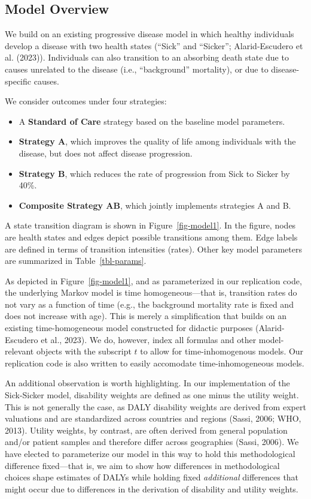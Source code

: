 \documentclass[
]{agujournal2019}
\providecommand{\tightlist}{%
  \setlength{\itemsep}{0pt}\setlength{\parskip}{0pt}}\usepackage{longtable,booktabs,array}
\begin{document}
\subsection{Model Overview}\label{sec-overview}

We build on an existing progressive disease model in which healthy
individuals develop a disease with two health states (``Sick'' and
``Sicker''; Alarid-Escudero et al. (2023)). Individuals can also
transition to an absorbing death state due to causes unrelated to the
disease (i.e., ``background'' mortality), or due to disease-specific
causes.

We consider outcomes under four strategies:

\begin{itemize}
\tightlist
\item
  A \textbf{Standard of Care} strategy based on the baseline model
  parameters.
\item
  \textbf{Strategy A}, which improves the quality of life among
  individuals with the disease, but does not affect disease progression.
\item
  \textbf{Strategy B}, which reduces the rate of progression from Sick
  to Sicker by 40\%.
\item
  \textbf{Composite Strategy AB}, which jointly implements strategies A
  and B.
\end{itemize}

A state transition diagram is shown in Figure~\ref{fig-model1}. In the
figure, nodes are health states and edges depict possible transitions
among them. Edge labels are defined in terms of transition intensities
(rates). Other key model parameters are summarized in
Table~\ref{tbl-params}.

As depicted in Figure~\ref{fig-model1}, and as parameterized in our
replication code, the underlying Markov model is time homogeneous---that
is, transition rates do not vary as a function of time (e.g., the
background mortality rate is fixed and does not increase with age). This
is merely a simplification that builds on an existing time-homogeneous
model constructed for didactic purposes (Alarid-Escudero et al., 2023).
We do, however, index all formulas and other model-relevant objects with
the subscript \(t\) to allow for time-inhomogenous models. Our
replication code is also written to easily accomodate time-inhomogeneous
models.

An additional observation is worth highlighting. In our implementation
of the Sick-Sicker model, disability weights are defined as one minus
the utility weight. This is not generally the case, as DALY disability
weights are derived from expert valuations and are standardized across
countries and regions (Sassi, 2006; WHO, 2013). Utility weights, by
contrast, are often derived from general population and/or patient
samples and therefore differ across geographies (Sassi, 2006). We have
elected to parameterize our model in this way to hold this
methodological difference fixed---that is, we aim to show how
differences in methodological choices shape estimates of DALYs while
holding fixed \emph{additional} differences that might occur due to
differences in the derivation of disability and utility weights.
\end{document}
